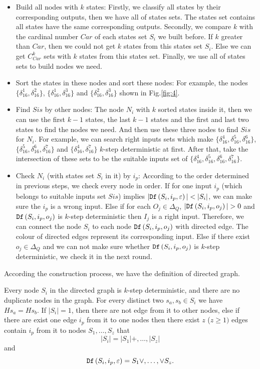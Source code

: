 \begin{itemize}
\item Build all nodes with $k$ states: Firstly, we classify all states by their corresponding outputs, then we have all of states sets. The states set contains all states have the same corresponding outputs. Secondly, we compare $k$ with the cardinal number $Car$ of each states set $S_i$ we built before. If $k$ greater than $Car$, then we could not get $k$ states from this states set $S_i$. Else we can get $C_{Car}^k$ sets with $k$ states from this states set. Finally, we use all of states sets to build nodes we need. 
 \item Sort the states in these nodes and sort these nodes: For example, the nodes $\{\delta_{16}^1,\delta_{16}^2\}$, $\{\delta_{16}^1,\delta_{16}^3\}$ and $\{\delta_{16}^2,\delta_{16}^3\}$ shown in Fig.\ref{fig:4}. 
  \item Find $Sis$ by other nodes: The node $N_i$ with $k$ sorted states inside it, then we can use the first $k-1$ states, the last $k-1$ states and the first and last two states to find the nodes we need. And then use these three nodes to find $Sis$ for $N_i$. For example, we can search right inputs sets which make $\{\delta_{16}^4,\delta_{16}^5,\delta_{16}^6\}$, $\{\delta_{16}^5,\delta_{16}^6,\delta_{16}^7\}$ and $\{\delta_{16}^4,\delta_{16}^7\}$ $k$-step deterministic at first. After that, take the intersection of these sets to be the suitable inputs set of $\{\delta_{16}^4,\delta_{16}^5,\delta_{16}^6,\delta_{16}^7\}$. 
  \item Check $N_i$ (with states set $S_i$ in it) by $i_p$: According to the order determined in previous steps, we check every node in order. If for one input $i_p$ (which belongs to suitable inputs set $Sis$) implies $|\Ded\left(S_i,i_p,\varepsilon\right)|<|S_i|$, we can make sure the $i_p$ is a wrong input. Else if for each $O_j \in \Delta_Q$, $|\Ded\left(S_i,i_p,o_j\right)|>0$ and ${\tt Df}\left(S_i,i_p,o_j\right)$ is $k$-step deterministic then $I_j$ is a right input. Therefore, we can connect the node $S_i$ to each node ${\tt Df}\left(S_i,i_p,o_j\right)$ with directed edge. The colour of directed edges represent its corresponding input. Else if there exist $o_j \in \Delta_Q$ and we can not make sure whether ${\tt Df}\left(S_i,i_p,o_j\right)$ is $k$-step deterministic, we check it in the next round. 
\end{itemize} 

According the construction process, we have the definition of directed graph.
\begin{definition}
Every node $S_i$ in the directed graph is $k$-step deterministic, and there are no duplicate nodes in the graph. For every distinct two $s_a, s_b \in S_i$ we have $Hs_a=Hs_b$. If $|S_i|=1$, then there are not edge from it to other nodes, else if there are exist one edge $i_p$ from it to one nodes then there exist $z$ ($z\ge 1)$ edges contain $i_p$ from it to nodes $S_1,\ldots,S_z$ that \[|S_i|= |S_1|+,\ldots,|S_z|\] and \[{\tt Df}\left(S_i,i_p,\varepsilon\right)=S_1\vee,\ldots,\vee S_z.\]
\end{definition}

